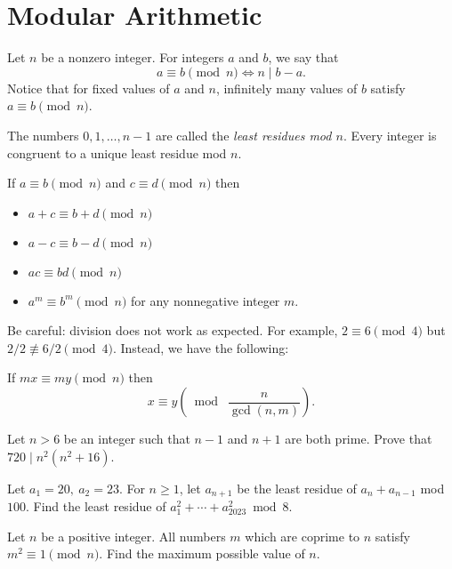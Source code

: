 \section{Modular Arithmetic}
  Let $n$ be a nonzero integer. For integers $a$ and $b$, we say that
  \[a\equiv b\pmod n\iff n\mid b-a.\]
  Notice that for fixed values of $a$ and $n$, infinitely many values of $b$
  satisfy $a\equiv b\pmod n$.

  The numbers $0,1,\ldots,n-1$ are called the \emph{least residues mod $n$}. 
  Every integer is congruent to a unique least residue mod $n$.
  \begin{result}{\label{r:n:n:m:1}}
  If $a\equiv b\pmod n$ and $c\equiv d\pmod n$ then
  \begin{itemize}
    \item $a+c\equiv b+d\pmod n$
    \item $a-c\equiv b-d\pmod n$
    \item $ac\equiv bd\pmod n$
    \item $a^m\equiv b^m\pmod n$ for any nonnegative integer $m$.
  \end{itemize}
\end{result}
Be careful: division does not work as expected. For example, $2\equiv 6\pmod 4$
but $2/2\not\equiv 6/2\pmod 4$. Instead, we have the following:
\begin{result}{\label{r:n:n:m:2}}
    If $mx\equiv my\pmod n$ then \[x\equiv y\left(\bmod\;\frac n{\gcd(n,m)}\right).\]
\end{result}
\begin{problem}{\label{p:n:n:m:1}}
  Let $n>6$ be an integer such that $n-1$ and $n+1$ are both prime. Prove
    that $720\mid n^2(n^2+16)$.
\end{problem}
\begin{problem}{\label{p:n:n:m:2}}
  Let $a_1=20,\ a_2=23$. For $n\ge 1$, let $a_{n+1}$ be the least residue
    of $a_n+a_{n-1}$ mod $100$. Find the least residue of
    $a_1^2+\cdots+a_{2023}^2\bmod 8$.
\end{problem}
\begin{problem}{\label{p:n:n:m:3}}
  Let $n$ be a positive integer. All numbers $m$ which are coprime to $n$
    satisfy $m^2\equiv 1\pmod n$. Find the maximum possible value of $n$.
\end{problem}
